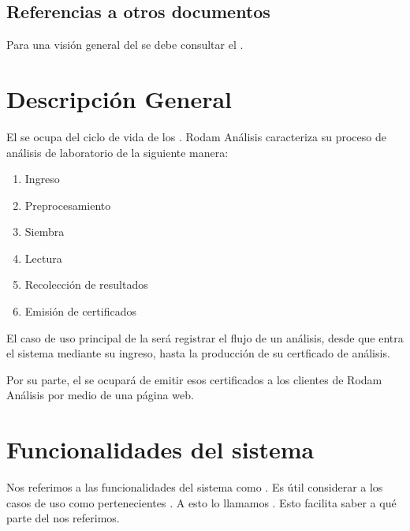 \documentclass[letterpaper,10pt,spanish]{sphinxmanual}
\begin{document}
\subsection{Referencias a otros documentos}
\label{\detokenize{requerimientos/srs:referencias-a-otros-documentos}}
Para una visión general del  se debe consultar el .


\section{Descripción General}
\label{\detokenize{requerimientos/srs:descripcion-general}}
El  se ocupa del ciclo de vida de los .  Rodam Análisis caracteriza su proceso de análisis de laboratorio
de la siguiente manera:
\begin{enumerate}
%
\item {} 
Ingreso

\item {} 
Preprocesamiento

\item {} 
Siembra

\item {} 
Lectura

\item {} 
Recolección de resultados

\item {} 
Emisión de certificados

\end{enumerate}

El caso de uso principal de la  será
registrar el flujo de un análisis, desde
que entra el sistema mediante su ingreso, hasta la producción de su
certficado de análisis.

Por su parte, el  se ocupará de emitir esos certificados
a los clientes de Rodam Análisis por medio de una página web.


\section{Funcionalidades del sistema}
\label{\detokenize{requerimientos/srs:funcionalidades-del-sistema}}
Nos referimos a las funcionalidades del sistema como .
Es útil considerar a los casos de uso como pertenecientes . A
esto lo llamamos . Esto facilita
saber a qué parte del  nos referimos.
\end{document}

